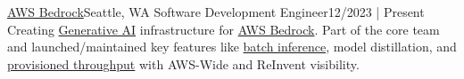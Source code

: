 \resumeSubheading
{\href{https://aws.amazon.com/bedrock/}{AWS Bedrock}}{Seattle, WA}
{Software Development Engineer}{12/2023 | Present}
\resumeItemListStart
{}
{Creating \href{https://en.wikipedia.org/wiki/Generative_artificial_intelligence}{Generative AI} infrastructure for \href{https://aws.amazon.com/bedrock/}{AWS Bedrock}. Part of the core team and launched/maintained key features like \href{https://docs.aws.amazon.com/bedrock/latest/userguide/batch-inference.html}{batch inference}, model distillation, and \href{https://docs.aws.amazon.com/bedrock/latest/userguide/prov-throughput.html}{provisioned throughput} with AWS-Wide and ReInvent visibility.}
\resumeItemListEnd
